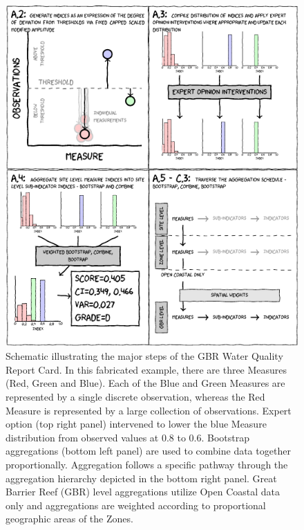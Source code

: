 \begin{figure}[h]
\includegraphics[width=\linewidth]{figures/Diagrams/schematic.pdf}
\caption[Schematic illustrating the major steps of the GBR Water Quality Report Card]{Schematic illustrating the major steps of the GBR Water Quality Report Card. In this fabricated example,
there are three Measures (Red, Green and Blue).  Each of the Blue and Green Measures are represented by a single
discrete observation, whereas the Red Measure is represented by a large collection of observations.
Expert option (top right panel) intervened to lower the blue Measure distribution from observed values at 0.8 to 0.6. Bootstrap aggregations (bottom left panel)
are used to combine data together proportionally.  Aggregation follows a specific pathway through the aggregation hierarchy depicted in the bottom right panel.
Great Barrier Reef (GBR) level aggregations utilize Open Coastal data only and aggregations are weighted according to proportional geographic areas of the Zones.
}\label{fig:schematic}
\end{figure}

\clearpage




